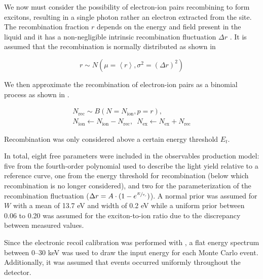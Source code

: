 We now must consider the possibility of electron-ion pairs recombining to form excitons, resulting in a single photon rather an electron extracted from the site.  The recombination fraction $r$ depends on the energy and field present in the liquid and it has a non-negligible intrinsic recombination fluctuation $\Delta r$ \cite{akerib2016tritium, aprile2017tritium}.  It is assumed that the recombination is normally distributed as shown in 

\begin{equation}
        \label{eqn:xe1t_recombination_fluc}
        r \sim N(\mu = \left< r \right>, \sigma^2 = (\Delta r)^2)
\end{equation}

We then approximate the recombination of electron-ion pairs as a binomial process as shown in .

\begin{equation}
        \label{eqn:xe1t_recombination}
        \begin{gathered}
                N_{\textrm{rec}} \sim B(N = N_{\textrm{ion}}, p = r), \\ 
                N_{\textrm{ion}} \leftarrow N_{\textrm{ion}} - N_{\textrm{rec}}, \, \, \,  N_{\textrm{ex}} \leftarrow N_{\textrm{ex}} + N_{\textrm{rec}}
        \end{gathered}
\end{equation}


Recombination was only considered above a certain energy threshold $E_t$.  

In total, eight free parameters were included in the observables production model: five from the fourth-order polynomial used to describe the light yield relative to a reference curve, one from the energy threshold for recombination (below which recombination is no longer considered), and two for the parameterization of the recombination fluctuation ($\Delta r = A \cdot (1 - e^{\sfrac{E}{\tau_r}})$).  A normal prior was assumed for $W$ with a mean of 13.7 eV and width of 0.2 eV while a uniform prior between 0.06 to 0.20 \cite{takahashi1975average, aprile2007observation} was assumed for the exciton-to-ion ratio due to the discrepancy between measured values.  



Since the electronic recoil calibration was performed with , a flat energy spectrum between 0--30 keV was used to draw the input energy for each Monte Carlo event.  Additionally, it was assumed that events occurred uniformly throughout the detector.



